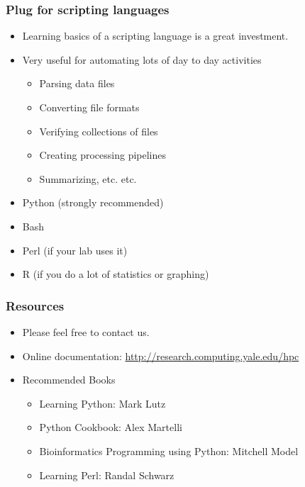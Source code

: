 \documentclass[10pt]{beamer}
\begin{document}
\begin{frame}[fragile]
\frametitle{Plug for scripting languages}

\begin{itemize}
\item Learning basics of a scripting language is a great investment.
\item Very useful for automating lots of day to day activities
\begin{itemize}
\item Parsing data files
\item Converting file formats
\item Verifying collections of files
\item Creating processing pipelines
\item Summarizing, etc. etc.
\end{itemize}
\item Python (strongly recommended)
\item Bash 
\item Perl (if your lab uses it)
\item R (if you do a lot of statistics or graphing)
\end{itemize}

\end{frame}

\begin{frame}[fragile]
\frametitle{Resources}

\begin{itemize}
\item Please feel free to contact us.
\item Online documentation: \url{http://research.computing.yale.edu/hpc}
\item Recommended Books
\begin{itemize}
\item Learning Python: Mark Lutz
\item Python Cookbook: Alex Martelli
\item Bioinformatics Programming using Python: Mitchell Model
\item Learning Perl: Randal Schwarz
\end{itemize}
\end{itemize}

\end{frame}
\end{document}
